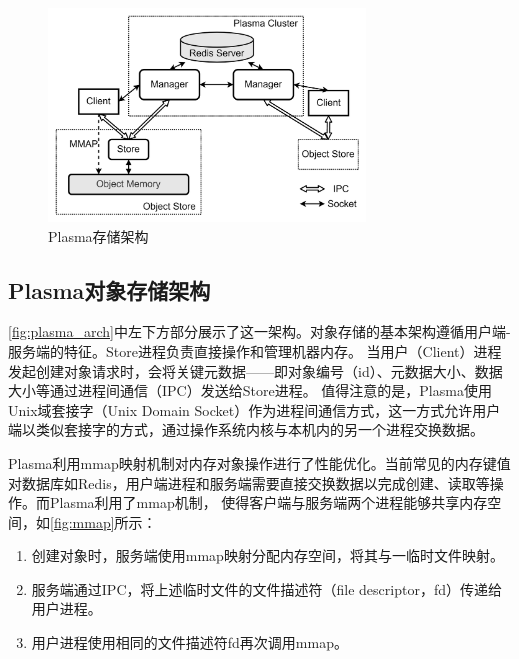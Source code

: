 \begin{figure}[h]
    \centering
    \includegraphics[width=0.75\textwidth]{image/chap02/plasma_arch.png}
    \caption{Plasma存储架构}
    \label{fig:plasma_arch}
\end{figure}

\subsection{Plasma对象存储架构}

\autoref{fig:plasma_arch}中左下方部分展示了这一架构。对象存储的基本架构遵循用户端-服务端的特征。Store进程负责直接操作和管理机器内存。
当用户（Client）进程发起创建对象请求时，会将关键元数据——即对象编号（id）、元数据大小、数据大小等通过进程间通信（IPC）发送给Store进程。
值得注意的是，Plasma使用Unix域套接字（Unix Domain Socket）作为进程间通信方式，这一方式允许用户端以类似套接字的方式，通过操作系统内核与本机内的另一个进程交换数据。

Plasma利用mmap映射机制对内存对象操作进行了性能优化。当前常见的内存键值对数据库如Redis，用户端进程和服务端需要直接交换数据以完成创建、读取等操作。而Plasma利用了mmap机制，
使得客户端与服务端两个进程能够共享内存空间，如\autoref{fig:mmap}所示：

\begin{enumerate}
    \item 创建对象时，服务端使用mmap映射分配内存空间，将其与一临时文件映射。
    \item 服务端通过IPC，将上述临时文件的文件描述符（file descriptor，fd）传递给用户进程。
    \item 用户进程使用相同的文件描述符fd再次调用mmap。
\end{enumerate}

